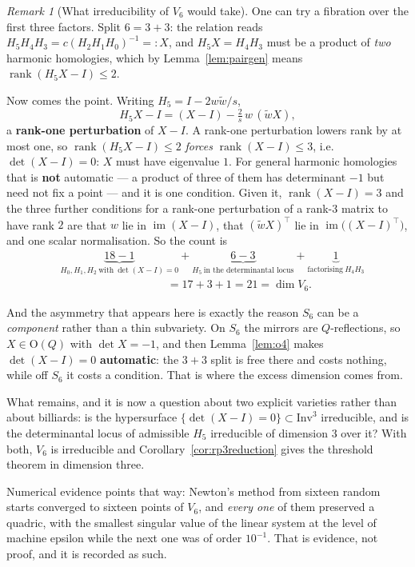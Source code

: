 \documentclass[11pt,a4paper]{article}
\theoremstyle{plain}
\theoremstyle{definition}
\theoremstyle{remark}
\newtheorem{remark}[theorem]{Remark}
\begin{document}
\begin{remark}[What irreducibility of $V_6$ would take]\label{rem:v6irr}
One can try a fibration over the first three factors. Split $6=3+3$: the relation reads
$H_5H_4H_3=c(H_2H_1H_0)^{-1}=:X$, and $H_5X=H_4H_3$ must be a product of \emph{two}
harmonic homologies, which by Lemma~\ref{lem:pairgen} means
$\operatorname{rank}(H_5X-I)\le2$.

Now comes the point. Writing $H_5=I-2w\tilde w/s$,
\[
  H_5X-I=(X-I)-\tfrac2s\,w\,(\tilde wX),
\]
a \textbf{rank-one perturbation} of $X-I$. A rank-one perturbation lowers rank by at
most one, so $\operatorname{rank}(H_5X-I)\le2$ \emph{forces}
$\operatorname{rank}(X-I)\le3$, i.e.\ $\det(X-I)=0$: $X$ must have eigenvalue $1$.
For general harmonic homologies that is \textbf{not} automatic --- a product of three
of them has determinant $-1$ but need not fix a point --- and it is one condition.
Given it, $\operatorname{rank}(X-I)=3$ and the three further conditions for a
rank-one perturbation of a rank-$3$ matrix to have rank $2$ are that $w$ lie in
$\operatorname{im}(X-I)$, that $(\tilde wX)^\top$ lie in
$\operatorname{im}\bigl((X-I)^\top\bigr)$, and one scalar normalisation. So the count
is
\[
\begin{aligned}
  &\underbrace{18-1}_{H_0,H_1,H_2\ \text{with}\ \det(X-I)=0}
  +\underbrace{6-3}_{H_5\ \text{in the determinantal locus}}
  +\underbrace{1}_{\text{factorising}\ H_4H_3}\\
  &\hspace{4cm}=17+3+1=21=\dim V_6 .
\end{aligned}
\]

And the asymmetry that appears here is exactly the reason $S_6$ can be a
\emph{component} rather than a thin subvariety. On $S_6$ the mirrors are
$Q$-reflections, so $X\in\mathrm{O}(Q)$ with $\det X=-1$, and then
Lemma~\ref{lem:o4} makes $\det(X-I)=0$ \textbf{automatic}: the $3+3$ split is free
there and costs nothing, while off $S_6$ it costs a condition. That is where the
excess dimension comes from.

What remains, and it is now a question about two explicit varieties rather than
about billiards: is the hypersurface $\{\det(X-I)=0\}\subset\mathrm{Inv}^3$
irreducible, and is the determinantal locus of admissible $H_5$ irreducible of
dimension $3$ over it? With both, $V_6$ is irreducible and
Corollary~\ref{cor:rp3reduction} gives the threshold theorem in dimension three.

Numerical evidence points that way: Newton's method from sixteen random starts
converged to sixteen points of $V_6$, and \emph{every one} of them preserved a
quadric, with the smallest singular value of the linear system at the level of
machine epsilon while the next one was of order $10^{-1}$. That is evidence, not
proof, and it is recorded as such.
\end{remark}
\end{document}
